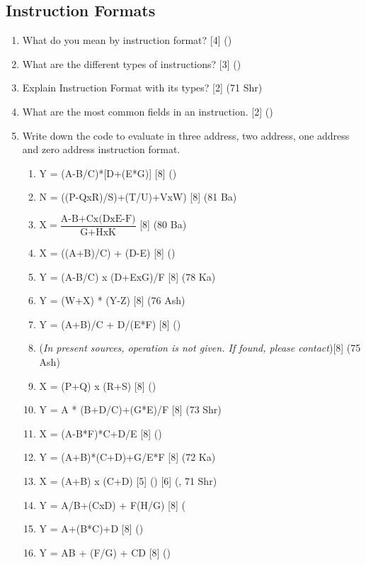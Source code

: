 \documentclass[12pt]{article}
\begin{document}
	\subsection{Instruction Formats}
	\begin{enumerate}[noitemsep, topsep = 0pt]
		\item What do you mean by instruction format? \hfill [4] ()
		
		\item What are the different types of instructions? \hfill [3] ()
		
		\item Explain Instruction Format with its types? \hfill [2] (71 Shr)
		
		\item What are the most common fields in an instruction. \hfill [2] ()
		
		\item Write down the code to evaluate in three address, two address, one address and zero address instruction format.
		\begin{enumerate}[noitemsep, topsep = 0pt, label = \alph*.]
			\item Y = (A-B/C)*[D+(E*G)] \hfill [8] ()
			\item N = ((P-QxR)/S)+(T/U)+VxW) \hfill [8] (81 Ba)
			\item $\text{X} = \dfrac{\text{A-B+Cx(DxE-F})}{\text{G+HxK}}$ \hfill [8] (80 Ba)
			\item X = ((A+B)/C) + (D-E) \hfill [8] ()
			\item Y = (A-B/C) x (D+ExG)/F \hfill [8] (78 Ka)
			\item Y = (W+X) * (Y-Z) \hfill [8] (76 Ash)
			\item Y = (A+B)/C + D/(E*F) \hfill [8] ()
			\item (\textit{In present sources, operation is not given. If found, please contact})\hfill [8] (75 Ash)
			\item X = (P+Q) x (R+S) \hfill [8] ()
			\item Y = A * (B+D/C)+(G*E)/F \hfill [8] (73 Shr)
			\item X = (A-B*F)*C+D/E \hfill [8] ()
			\item Y = (A+B)*(C+D)+G/E*F \hfill [8] (72 Ka)
			\item X = (A+B) x (C+D) \hfill [5] () [6] (, 71 Shr)
			\item Y = A/B+(CxD) + F(H/G) \hfill [8] (
			\item Y = A+(B*C)+D \hfill [8] ()
			\item Y = AB + (F/G) + CD [8] ()
			
		\end{enumerate}
	\end{enumerate}
\end{document}
